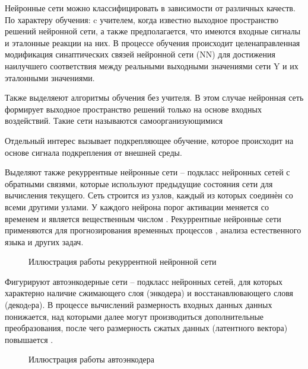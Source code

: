 Нейронные сети можно классифицировать в зависимости от различных качеств. По характеру обучения: c учителем, когда известно выходное пространство решений нейронной сети, а также предполагается, что имеются входные сигналы и
эталонные реакции на них. В процессе обучения происходит целенаправленная модификация синаптических связей нейронной сети (NN)
для достижения наилучшего соответствия между реальными выходными значениями сети Y и их эталонными значениями.

Также выделяеют алгоритмы обучения без учителя. В этом случае нейронная сеть формирует выходное
пространство решений только на основе входных воздействий. Такие
сети называются самоорганизующимися

Отдельный интерес вызывает подкрепляющее обучение, которое происходит на основе сигнала подкрепления от внешней среды.

Выделяют также рекуррентные нейронные сети -- подкласс нейронных сетей с обратными связями, которые
используют предыдущие состояния сети для вычисления текущего. Сеть строится из узлов, каждый
из которых соединѐн со всеми другими узлами. У каждого нейрона порог активации меняется со
временем и является вещественным числом \cite{bguir_rnn}. 
Рекуррентные нейронные сети применяются для прогнозирования временных процессов \cite{bgu_krasn}, анализа естественного языка и других задач.
\begin{figure}[H]
	\caption{Иллюстрация работы рекуррентной нейронной сети}
\end{figure}

Фигурируют автоэнкодерные сети -- подкласс нейронных сетей, для которых характерно наличие сжимающего слоя (энкодера) и восстанавлювающего словя (декодeра).
В процессе вычислений размерность входных данных данных понижается, над которыми далее могут производиться дополнительные преобразования, 
после чего размерность сжатых данных (латентного вектора) повышается \cite{vae}.
\begin{figure}[H]
	\caption{Иллюстрация работы автоэнкодера}
\end{figure}

